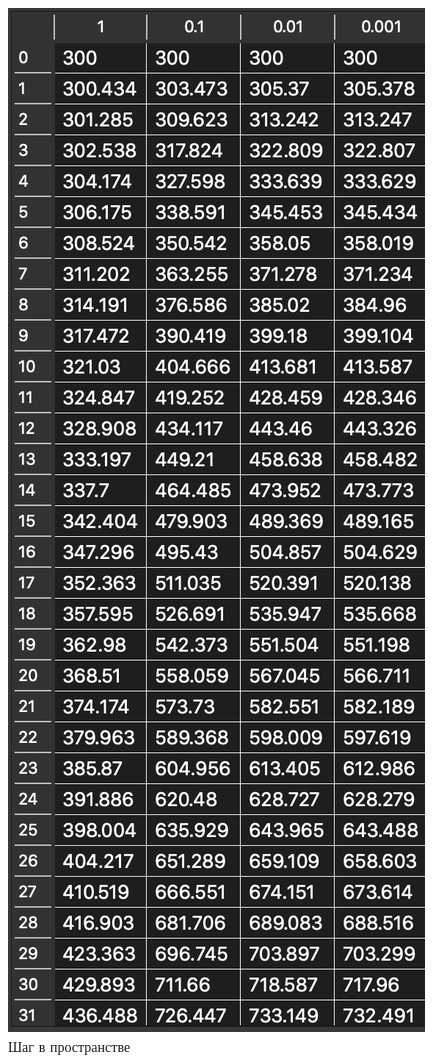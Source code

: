 \begin{enumerate}
        \begin{figure}[H]
            \centering
            \includegraphics[scale=0.6]{img/steph.png}
            \caption{Шаг в пространстве}
            \label{img:steph}
        \end{figure}


\end{enumerate}
